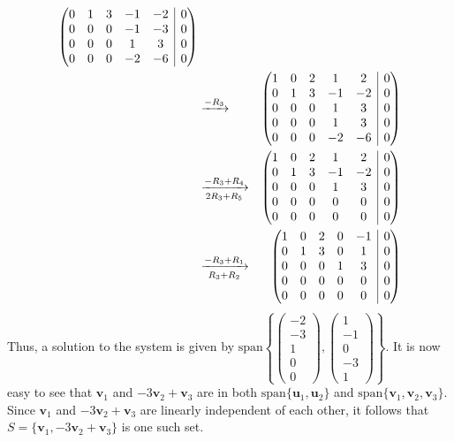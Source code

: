 \documentclass{article}
\makeatletter
\newcommand{\spn}{\text{span}}
\newenvironment{rowequmat}[1]{\left(\array{@{}#1@{}}}{\endarray\right)}
\makeatother
\begin{document}
\begin{enumerate}[(a)]
\begin{eqnarray*}
\begin{rowequmat}{ccccc|c}
     0 &  1 & 3 & -1&-2&0 \\
     0 & 0 & 0 & -1&-3&0\\
     0 & 0 & 0 & 1 &3&0\\
     0&0&0&-2&-6&0
\end{rowequmat}\\
&\xrightarrow{-R_3}&\begin{rowequmat}{ccccc|c}
     1 &  0 & 2 & 1&2&0 \\
     0 &  1 & 3 & -1&-2&0 \\
     0 & 0 & 0 & 1&3&0\\
     0 & 0 & 0 & 1 &3&0\\
     0&0&0&-2&-6&0
\end{rowequmat}\\
&\xrightarrow[2R_3+R_5]{-R_3+R_4}&\begin{rowequmat}{ccccc|c}
     1 &  0 & 2 & 1&2&0 \\
     0 &  1 & 3 & -1&-2&0 \\
     0 & 0 & 0 & 1&3&0\\
     0 & 0 & 0 & 0 &0&0\\
     0&0&0&0&0&0
\end{rowequmat}\\
&\xrightarrow[R_3+R_2]{-R_3+R_1}&\begin{rowequmat}{ccccc|c}
     1 &  0 & 2 & 0&-1&0 \\
     0 &  1 & 3 & 0&1&0 \\
     0 & 0 & 0 & 1&3&0\\
     0 & 0 & 0 & 0 &0&0\\
     0&0&0&0&0&0
\end{rowequmat}
\end{eqnarray*}
Thus, a solution to the system is given by $\spn\left\{\begin{pmatrix}-2\\-3\\1\\0\\0\end{pmatrix},\begin{pmatrix}1\\-1\\0\\-3\\1\end{pmatrix}\right\}.$ It is now easy to see that $\textbf{v}_1$ and $-3\textbf{v}_2+\textbf{v}_3$ are in both $\spn\{\textbf{u}_1,\textbf{u}_2\}$ and $\spn\{\textbf{v}_1,\textbf{v}_2,\textbf{v}_3\}.$ Since $\textbf{v}_1$ and $-3\textbf{v}_2+\textbf{v}_3$ are linearly independent of each other, it follows that $S=\{\textbf{v}_1,-3\textbf{v}_2+\textbf{v}_3\}$ is one such set.

\end{enumerate}
\end{document}
